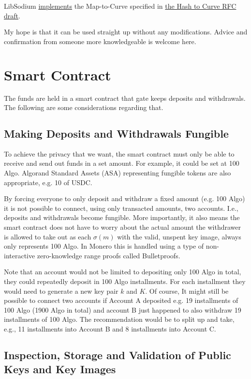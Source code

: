 \documentclass[9pt]{article}
\begin{document}
 LibSodium \href{https://elligator.org/implementations}{implements} the Map-to-Curve specified in \href{https://datatracker.ietf.org/doc/html/draft-irtf-cfrg-hash-to-curve-16}{the Hash to Curve RFC draft}.

My hope is that it can be used straight up without any modifications. Advice and confirmation from someone more knowledgeable is welcome here.

\section{Smart Contract}

The funds are held in a smart contract that gate keeps deposits and withdrawals. The following are some considerations regarding that.

\subsection{Making Deposits and Withdrawals Fungible}

To achieve the privacy that we want, the smart contract must only be able to receive and send out funds in a set amount. For example, it could be set at 100 Algo. Algorand Standard Assets (ASA) representing fungible tokens are also appropriate, e.g. 10 of USDC.

By forcing everyone to only deposit and withdraw a fixed amount (e.g. 100 Algo) it is not possible to connect, using only transacted amounts, two accounts. I.e., deposits and withdrawals become fungible. More importantly, it also means the smart contract does not have to worry about the actual amount the withdrawer is allowed to take out as each $\sigma(m)$ with the valid, unspent key image, always only represents 100 Algo. In Monero this is handled using a type of non-interactive zero-knowledge range proofs called Bulletproofs.

Note that an account would not be limited to depositing only 100 Algo in total, they could repeatedly deposit in 100 Algo installments. For each installment they would need to generate a new key pair $k$ and $K$. Of course, It might still be possible to connect two accounts if Account A deposited e.g. 19 installments of 100 Algo (1900 Algo in total) and account B just happened to also withdraw 19 installments of 100 Algo. The recommendation would be to split up and take, e.g., 11 installments into Account B and 8 installments into Account C. 

\subsection{Inspection, Storage and Validation of Public Keys and Key Images}
\end{document}
